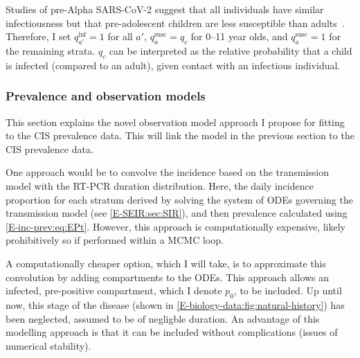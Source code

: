 \documentclass[thesis.tex]{subfiles}
\begin{document}
Studies of pre-Alpha SARS-CoV-2 suggest that all individuals have similar infectiousness but that pre-adolescent children are less susceptible than adults~\autocite{chenRole,vinerTransmission}.
Therefore, I set $q^\text{inf}_{a'} = 1$ for all $a'$, $q^\text{susc}_{a} = q_c$ for 0--11 year olds, and $q^\text{susc}_{a} = 1$ for the remaining strata.
$q_c$ can be interpreted as the relative probability that a child is infected (compared to an adult), given contact with an infectious individual.

\subsubsection{Prevalence and observation models} \label{SEIR:sec:observation}

This section  explains the novel observation model approach I propose for fitting to the CIS prevalence data.
This will link the model in the previous section to the CIS prevalence data.

One approach would be to convolve the incidence based on the transmission model with the RT-PCR duration distribution.
Here, the daily incidence proportion for each stratum derived by solving the system of ODEs governing the transmission model (see \cref{E-SEIR:sec:SIR}), and then prevalence calculated using \cref{E-inc-prev:eq:EPt}.
However, this approach is computationally expensive, likely prohibitively so if performed within a MCMC loop.

A computationally cheaper option, which I will take, is to approximate this convolution by adding compartments to the ODEs.
This approach allows an infected, pre-positive compartment, which I denote $p_0$, to be included.
Up until now, this stage of the disease (shown in \cref{E-biology-data:fig:natural-history}) has been neglected, assumed to be of negligble duration.
An advantage of this modelling approach is that it can be included without complications (\eg issues of numerical stability).
\end{document}
